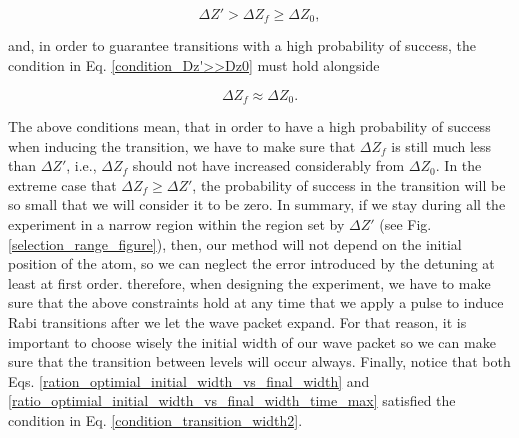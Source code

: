 \documentclass{article}
\begin{document}
\begin{equation}\label{condition_transition_width1}
    \Delta Z' > \Delta Z_{f} \ge \Delta Z_{0},
\end{equation}

and, in order to guarantee transitions with a high probability of success, the condition in Eq. \ref{condition_Dz'>>Dz0} must hold alongside

\begin{equation}\label{condition_transition_width2}
    \Delta Z_{f} \approx \Delta Z_{0}.
\end{equation}

The above conditions mean, that in order to have a high probability of success when inducing the transition, we have to make sure that $\Delta Z_{f}$ is still much less than $\Delta Z'$, i.e.,  $\Delta Z_{f}$ should not have increased considerably from $\Delta Z_{0}$. In the extreme case that $\Delta Z_{f} \ge \Delta Z'$, the probability of success in the transition will be so small that we will consider it to be zero. 
In summary, if we stay during all the experiment in a narrow region within the region set by $\Delta Z'$ (see Fig. \ref{selection_range_figure}), then, our method will not depend on the initial position of the atom, so we can neglect the error introduced by the detuning at least at first order.
therefore, when designing the experiment, we have to make sure that the above constraints hold at any time that we apply a pulse to induce Rabi transitions after we let the wave packet expand. For that reason, it is important to choose wisely the initial width of our wave packet so we can make sure that the transition between levels will occur always. Finally, notice that both Eqs. \ref{ration_optimial_initial_width_vs_final_width} and 
\ref{ratio_optimial_initial_width_vs_final_width_time_max} satisfied the condition in Eq. \ref{condition_transition_width2}.
\end{document}

